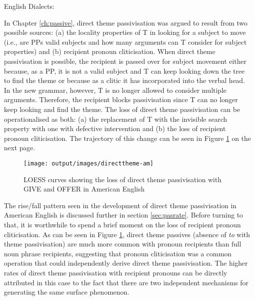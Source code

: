 \begin{exe}
	 English Dialects:
		\begin{xlist}
		\end{xlist}
\end{exe}
	
	In Chapter \ref{ch:passive}, direct theme passivisation was argued to result from two possible sources: (a) the locality properties of T in looking for a subject to move (i.e., are PPs valid subjects and how many arguments can T consider for subject properties) and (b) recipient pronoun cliticisation. When direct theme passivisation is possible, the recipient is passed over for subject movement either because, as a PP, it is not a valid subject and T can keep looking down the tree to find the theme or because as a clitic it has incorporated into the verbal head. In the new grammar, however, T is no longer allowed to consider multiple arguments. Therefore, the recipient blocks passivisation since T can no longer keep looking and find the theme. The loss of direct theme passivisation can be operationalised as both: (a) the replacement of T with the invisible search property with one with defective intervention and (b) the loss of recipient pronoun cliticisation. The trajectory of this change can be seen in Figure \ref{fig:loss-of-dt-in-amen} on the next page.

	\begin{figure}[ht!]
		\texttt{[image: output/images/directtheme-am]}
		\caption{LOESS curves showing the loss of direct theme passivisation with GIVE and OFFER in American English}
		\label{fig:loss-of-dt-in-amen}
	\end{figure}

	The rise/fall pattern seen in the development of direct theme passivisation in American English is discussed further in section \ref{sec:pasrate}. Before turning to that, it is worthwhile to spend a brief moment on the loss of recipient pronoun cliticisation. As can be seen in Figure \ref{fig:loss-of-dt-in-amen}, direct theme passives (absence of \textit{to} with theme passivisation) are much more common with pronoun recipients than full noun phrase recipients, suggesting that pronoun cliticisation was a common operation that could independently derive direct theme passivisation. The higher rates of direct theme passivisation with recipient pronouns can be directly attributed in this case to the fact that there are two independent mechanisms for generating the same surface phenomenon.
	
